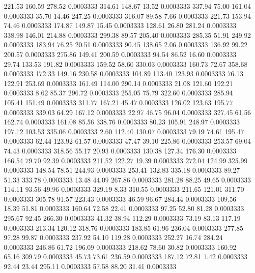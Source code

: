 221.53  160.59  278.52   0.0003333
 314.61  148.67   13.52   0.0003333
 337.94   75.00  161.04   0.0003333
  35.70   14.46  247.25   0.0003333
 316.07   89.58    7.66   0.0003333
 221.73  153.94   74.46   0.0003333
 174.87  149.87   15.45   0.0003333
 128.61   26.80  281.24   0.0003333
 338.98  146.01  214.88   0.0003333
 299.38   89.57  205.40   0.0003333
 285.35   51.91  249.92   0.0003333
 183.94   76.25   20.51   0.0003333
  90.45  138.65    2.06   0.0003333
 136.92   99.22  200.57   0.0003333
 275.86  149.41  200.59   0.0003333
  94.54   86.52   16.60   0.0003333
  29.74  133.53  191.82   0.0003333
 159.52   58.60  330.03   0.0003333
 160.73   72.67  358.68   0.0003333
 172.33  149.16  230.58   0.0003333
 104.89  113.40  123.93   0.0003333
  76.13  122.91  253.69   0.0003333
 161.49  114.00  290.14   0.0003333
  21.08  121.60  192.21   0.0003333
   8.62   85.37  296.72   0.0003333
 255.05   75.79  322.60   0.0003333
 285.94  105.41  151.49   0.0003333
 311.77  167.21   45.47   0.0003333
 126.02  123.63  195.77   0.0003333
 339.03   64.29  167.12   0.0003333
  22.97   46.75   96.04   0.0003333
 327.45   61.56  162.74   0.0003333
 161.08   85.56  338.76   0.0003333
  80.23  105.91  248.97   0.0003333
 197.12  103.53  335.06   0.0003333
   2.60  112.40  130.07   0.0003333
  79.19   74.61  195.47   0.0003333
  62.44  123.92   61.57   0.0003333
  47.47   39.10  225.86   0.0003333
 253.57   69.04   74.43   0.0003333
 318.56   55.17   20.93   0.0003333
 130.38  127.34  176.30   0.0003333
 166.54   79.70   92.39   0.0003333
 211.52  122.27   19.39   0.0003333
 272.04  124.99  325.99   0.0003333
 148.54   78.51  244.93   0.0003333
 253.41  132.83  335.18   0.0003333
  89.27   51.33  333.78   0.0003333
  13.48   44.09  267.86   0.0003333
 281.28   88.25   49.65   0.0003333
 114.11   93.56   49.96   0.0003333
 329.19    8.33  310.55   0.0003333
 211.65  121.01  311.70   0.0003333
 305.78   91.57  223.43   0.0003333
  46.59   96.67  284.44   0.0003333
 109.56   18.39   51.81   0.0003333
 160.64   72.58   22.41   0.0003333
  97.25   52.80   81.28   0.0003333
 295.67   92.45  266.30   0.0003333
  41.32   38.94  112.29   0.0003333
  73.19   83.13  117.19   0.0003333
 213.34  120.12  318.76   0.0003333
 183.85   61.96  236.04   0.0003333
 277.85   97.28   99.87   0.0003333
 237.92   54.10  119.28   0.0003333
 252.27   16.74  284.24   0.0003333
 246.86   61.72  196.09   0.0003333
 218.62   78.60   30.82   0.0003333
 160.92   65.16  309.79   0.0003333
  45.73   73.61  236.59   0.0003333
 187.12   72.81    1.42   0.0003333
  92.44   23.44  295.11   0.0003333
  57.58   88.20   31.41   0.0003333
